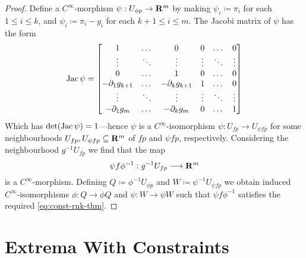 \begin{proof}
    Define a \(C^{\infty}\)-morphism \(\psi: U_{\phi p} \to \mathbf{R}^m\) by making
    \(\psi_i \coloneq \pi_i\) for each \(1 \leq i \leq k\), and
    \(\psi_i \coloneq \pi_i - g_i\) for each \(k+1 \leq i \leq m\). The Jacobi
    matrix of \(\psi\) has the form
    \[
        \operatorname{Jac} \psi =
        \begin{bmatrix}
            1                   & \dots  & 0
                                & 0      & \dots               & 0
            \\
            \vdots              & \ddots & \vdots
                                & \vdots & \ddots              & \vdots
            \\
            0                   & \dots  & 1
                                & 0      & \dots               & 0
            \\
            -\partial_1 g_{k+1} & \dots  & -\partial_k g_{k+1}
                                & 1      & \dots               & 0
            \\
            \vdots              & \ddots & \vdots
                                & \vdots & \ddots              & \vdots
            \\
            -\partial_1 g_m     & \dots  & -\partial_k g_m
                                & 0      & \dots               & 1
        \end{bmatrix}
    \]
    Which has \(\det(\operatorname{Jac} \psi) = 1\)---hence \(\psi\) is a
    \(C^{\infty}\)-isomorphism \(\psi: U_{f p} \to U_{\psi f p}\) for some
    neighbourhoods \(U_{f p}, U_{\psi f p} \subseteq \mathbf{R}^m\) of \(f p\) and
    \(\psi f p\), respectively. Considering the neighbourhood \(g^{-1} U_{f p}\) we
    find that the map
    \[
        \psi f \phi^{-1}: g^{-1} U_{f p} \longrightarrow \mathbf{R}^m
    \]
    is a \(C^{\infty}\)-morphism. Defining \(Q \coloneq \phi^{-1} U_{\phi p}\) and
    \(W \coloneq \psi^{-1} U_{\psi f p}\) we obtain induced
    \(C^{\infty}\)-isomorphisms \(\phi: Q \to \phi Q\) and \(\psi: W \to \psi W\)
    such that \(\psi f \phi^{-1}\) satisfies the required \cref{eq:const-rnk-thm}.
\end{proof}

\section{Extrema With Constraints}

